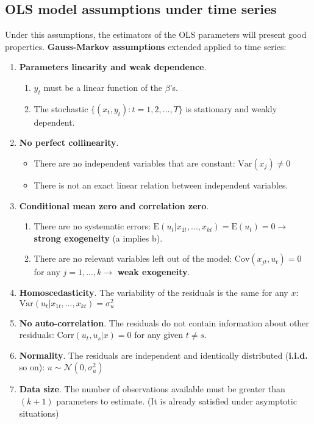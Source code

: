 \documentclass[10pt, a4paper, landscape]{extarticle}
\newcommand{\E}{\mathrm{E}}
\newcommand{\Var}{\mathrm{Var}}
\newcommand{\Cov}{\mathrm{Cov}}
\newcommand{\Corr}{\mathrm{Corr}}
\begin{document}
\begin{multicols}{3}
	\subsection*{OLS model assumptions under time series}
		Under this assumptions, the estimators of the OLS parameters will present good properties. \textbf{Gauss-Markov assumptions} extended applied to time series:
		\begin{enumerate}[leftmargin=*, label=ts\arabic*.]
			\item \textbf{Parameters linearity and weak dependence}.
			\begin{enumerate}[leftmargin=*, label=\alph*.]
				\item $y_t$ must be a linear function of the $\beta$'s.
				\item The stochastic $\lbrace(x_t, y_t): t = 1, 2, ..., T\rbrace$ is stationary and weakly dependent.
			\end{enumerate} 
			\item \textbf{No perfect collinearity}.
			\begin{itemize}[leftmargin=*]
				\item There are no independent variables that are constant: $\Var(x_j) \neq 0$
				\item There is not an exact linear relation between independent variables.
			\end{itemize}
			\item \textbf{Conditional mean zero and correlation zero}.
			\begin{enumerate}[leftmargin=*, label=\alph*.]
				\item There are no systematic errors: $\E(u_t | x_{1t}, ..., x_{kt}) = \E(u_t) = 0 \rightarrow$ \textbf{strong exogeneity} (a implies b).
				\item There are no relevant variables left out of the model: $\Cov(x_{jt} , u_t) = 0$ for any $j = 1, ..., k \rightarrow$ \textbf{weak exogeneity}.
			\end{enumerate}
			\item \textbf{Homoscedasticity}. The variability of the residuals is the same for any $x$: $\Var(u_t | x_{1t}, ..., x_{kt}) = \sigma^2_u$
			\item \textbf{No auto-correlation}. The residuals do not contain information about other residuals: $\Corr(u_t, u_s | x) = 0$ for any given $t \neq s$.
			\item \textbf{Normality}. The residuals are independent and identically distributed (\textbf{i.i.d.} so on): $u \sim \mathcal{N}(0,\sigma^2_u)$
			\item \textbf{Data size}. The number of observations available must be greater than $(k + 1)$ parameters to estimate. (It is already satisfied under asymptotic situations)
		\end{enumerate}	

\end{multicols}
\end{document}
